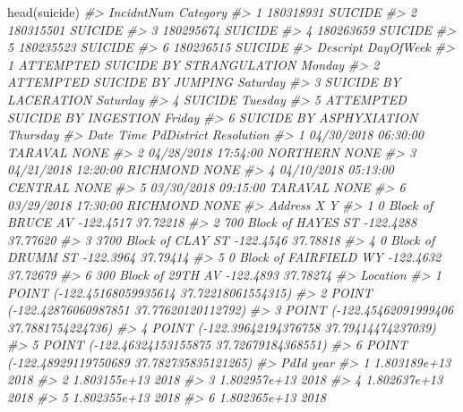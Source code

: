 \documentclass[
  12pt,
  openany]{book}
\newenvironment{Shaded}{\begin{snugshade}}{\end{snugshade}}
\newcommand{\CommentTok}[1]{\textcolor[rgb]{0.37,0.37,0.37}{\textit{#1}}}
\newcommand{\FunctionTok}[1]{\textcolor[rgb]{0,0,0}{#1}}
\newcommand{\NormalTok}[1]{#1}
\begin{document}
\begin{Shaded}
\begin{Highlighting}[]
\FunctionTok{head}\NormalTok{(suicide)}
\CommentTok{\#\textgreater{}   IncidntNum Category}
\CommentTok{\#\textgreater{} 1  180318931  SUICIDE}
\CommentTok{\#\textgreater{} 2  180315501  SUICIDE}
\CommentTok{\#\textgreater{} 3  180295674  SUICIDE}
\CommentTok{\#\textgreater{} 4  180263659  SUICIDE}
\CommentTok{\#\textgreater{} 5  180235523  SUICIDE}
\CommentTok{\#\textgreater{} 6  180236515  SUICIDE}
\CommentTok{\#\textgreater{}                             Descript DayOfWeek}
\CommentTok{\#\textgreater{} 1 ATTEMPTED SUICIDE BY STRANGULATION    Monday}
\CommentTok{\#\textgreater{} 2       ATTEMPTED SUICIDE BY JUMPING  Saturday}
\CommentTok{\#\textgreater{} 3              SUICIDE BY LACERATION  Saturday}
\CommentTok{\#\textgreater{} 4                            SUICIDE   Tuesday}
\CommentTok{\#\textgreater{} 5     ATTEMPTED SUICIDE BY INGESTION    Friday}
\CommentTok{\#\textgreater{} 6            SUICIDE BY ASPHYXIATION  Thursday}
\CommentTok{\#\textgreater{}         Date     Time PdDistrict Resolution}
\CommentTok{\#\textgreater{} 1 04/30/2018 06:30:00    TARAVAL       NONE}
\CommentTok{\#\textgreater{} 2 04/28/2018 17:54:00   NORTHERN       NONE}
\CommentTok{\#\textgreater{} 3 04/21/2018 12:20:00   RICHMOND       NONE}
\CommentTok{\#\textgreater{} 4 04/10/2018 05:13:00    CENTRAL       NONE}
\CommentTok{\#\textgreater{} 5 03/30/2018 09:15:00    TARAVAL       NONE}
\CommentTok{\#\textgreater{} 6 03/29/2018 17:30:00   RICHMOND       NONE}
\CommentTok{\#\textgreater{}                   Address         X        Y}
\CommentTok{\#\textgreater{} 1     0 Block of BRUCE AV {-}122.4517 37.72218}
\CommentTok{\#\textgreater{} 2   700 Block of HAYES ST {-}122.4288 37.77620}
\CommentTok{\#\textgreater{} 3   3700 Block of CLAY ST {-}122.4546 37.78818}
\CommentTok{\#\textgreater{} 4     0 Block of DRUMM ST {-}122.3964 37.79414}
\CommentTok{\#\textgreater{} 5 0 Block of FAIRFIELD WY {-}122.4632 37.72679}
\CommentTok{\#\textgreater{} 6    300 Block of 29TH AV {-}122.4893 37.78274}
\CommentTok{\#\textgreater{}                                         Location}
\CommentTok{\#\textgreater{} 1  POINT ({-}122.45168059935614 37.72218061554315)}
\CommentTok{\#\textgreater{} 2  POINT ({-}122.42876060987851 37.77620120112792)}
\CommentTok{\#\textgreater{} 3   POINT ({-}122.45462091999406 37.7881754224736)}
\CommentTok{\#\textgreater{} 4  POINT ({-}122.39642194376758 37.79414474237039)}
\CommentTok{\#\textgreater{} 5  POINT ({-}122.46324153155875 37.72679184368551)}
\CommentTok{\#\textgreater{} 6 POINT ({-}122.48929119750689 37.782735835121265)}
\CommentTok{\#\textgreater{}           PdId year}
\CommentTok{\#\textgreater{} 1 1.803189e+13 2018}
\CommentTok{\#\textgreater{} 2 1.803155e+13 2018}
\CommentTok{\#\textgreater{} 3 1.802957e+13 2018}
\CommentTok{\#\textgreater{} 4 1.802637e+13 2018}
\CommentTok{\#\textgreater{} 5 1.802355e+13 2018}
\CommentTok{\#\textgreater{} 6 1.802365e+13 2018}
\end{Highlighting}
\end{Shaded}
\end{document}
